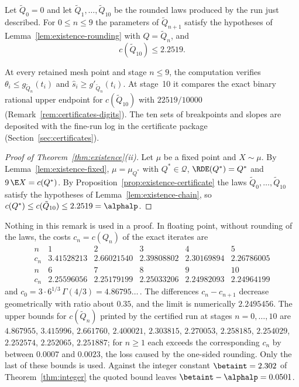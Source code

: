 \begin{proposition}\label{prop:existence-certificate}
Let $\tilde Q_0=0$ and let $\tilde Q_1,\dots,\tilde Q_{10}$ be the rounded laws produced by
the run just described. For $0\le n\le9$ the parameters of $\tilde Q_{n+1}$ satisfy the
hypotheses of Lemma~\ref{lem:existence-rounding} with $Q=\tilde Q_n$, and
\[
  c(\tilde Q_{10})\le2.2519 .
\]
\end{proposition}

At every retained mesh point and stage $n\le9$, the computation verifies
$\theta_i\le g_{\tilde Q_n}(t_i)$ and $\hat s_i\ge g'_{\tilde Q_n}(t_i)$. At stage~10
it compares the exact binary rational upper endpoint for $c(\tilde Q_{10})$ with
$22519/10000$ (Remark~\ref{rem:certificates-digits}). The ten sets of breakpoints
and slopes are deposited with the fine-run log in the certificate package
(Section~\ref{sec:certificates}).

\begin{proof}[Proof of Theorem~\ref{thm:existence}(ii)]
Let $\mu$ be a fixed point and $X\sim\mu$. By Lemma~\ref{lem:existence-fixed}, $\mu=\mu_{Q^*}$
with $Q^*\in\mathcal{Q}$, $\RDE(Q^*)=Q^*$ and $9\,\E X=c(Q^*)$. By
Proposition~\ref{prop:existence-certificate} the laws $\tilde Q_0,\dots,\tilde Q_{10}$ satisfy
the hypotheses of Lemma~\ref{lem:existence-chain}, so
$c(Q^*)\le c(\tilde Q_{10})\le2.2519=\alphalp$.
\end{proof}

\begin{remark}\label{rem:existence-float}
Nothing in this remark is used in a proof. In floating point, without rounding of the laws,
the costs $c_n=c(Q_n)$ of the exact iterates are
\[
\begin{array}{c|ccccc}
 n & 1 & 2 & 3 & 4 & 5\\\hline
 c_n & 3.41528213 & 2.66021540 & 2.39808802 & 2.30169894 & 2.26786005
\end{array}
\]
\[
\begin{array}{c|ccccc}
 n & 6 & 7 & 8 & 9 & 10\\\hline
 c_n & 2.25596056 & 2.25179199 & 2.25033206 & 2.24982093 & 2.24964199
\end{array}
\]
and $c_0=3\cdot6^{1/3}\,\Gamma(4/3)=4.86795\ldots$\,. The differences $c_n-c_{n+1}$ decrease
geometrically with ratio about $0.35$, and the limit is numerically $2.2495456$. The upper
bounds for $c(\tilde Q_n)$ printed by the certified run at stages $n=0,\dots,10$ are
$4.867955$, $3.415996$, $2.661760$, $2.400021$, $2.303815$, $2.270053$, $2.258185$,
$2.254029$, $2.252574$, $2.252065$, $2.251887$; for $n\ge1$ each exceeds the corresponding
$c_n$ by between $0.0007$ and $0.0023$, the loss caused by the one-sided rounding. Only the
last of these bounds is used. Against the integer constant $\betaint=2.302$ of
Theorem~\ref{thm:integer} the quoted bound leaves $\betaint-\alphalp=0.0501$.
\end{remark}
